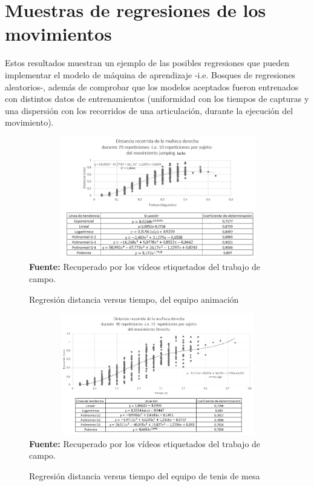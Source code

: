 \section{Muestras de regresiones de los movimientos} \label{res:regretions}
Estos resultados muestran un ejemplo de las posibles regresiones que pueden implementar el modelo de m\'aquina de aprendizaje -i.e. Bosques de regresiones aleatorios-, adem\'as de comprobar que los modelos aceptados fueron entrenados con distintos datos de entrenamientos (uniformidad con los tiempos de capturas y una dispersi\'on con los recorridos de una articulaci\'on, durante la ejecuci\'on del  movimiento).
\begin{figure}[H]
	\caption{Regresi\'on distancia versus tiempo, del equipo animaci\'on}
	\label{fig:regrCheerleader}
	\centering
	\includegraphics[width=445px,height=200px]{graphics/resultados/cluster-cheerleaders.PNG} \\
	\textbf{Fuente:} Recuperado por los v\'ideos etiquetados del trabajo de campo.
\end{figure}
\begin{figure}[H]
	\caption{Regresi\'on distancia versus tiempo  del equipo de tenis de mesa}
	\label{fig:regrTennisDeMesa}
	\centering
	\includegraphics[width=445px,height=200px]{graphics/resultados/cluster-tennis.PNG} \\
	\textbf{Fuente:} Recuperado por los v\'ideos etiquetados del trabajo de campo.
\end{figure}
